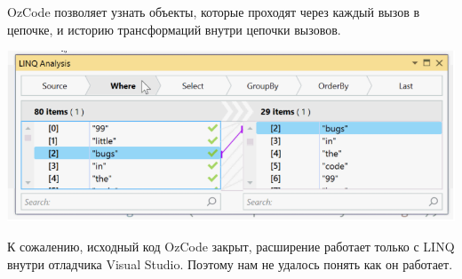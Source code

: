 OzCode позволяет узнать объекты, которые проходят через каждый вызов в цепочке, и историю трансформаций внутри цепочки вызовов.

\includegraphics[scale=0.6]{chapter1/img/linq.png}

К сожалению, исходный код OzCode закрыт, расширение работает только с LINQ внутри отладчика Visual Studio. Поэтому нам не удалось понять как он работает.
